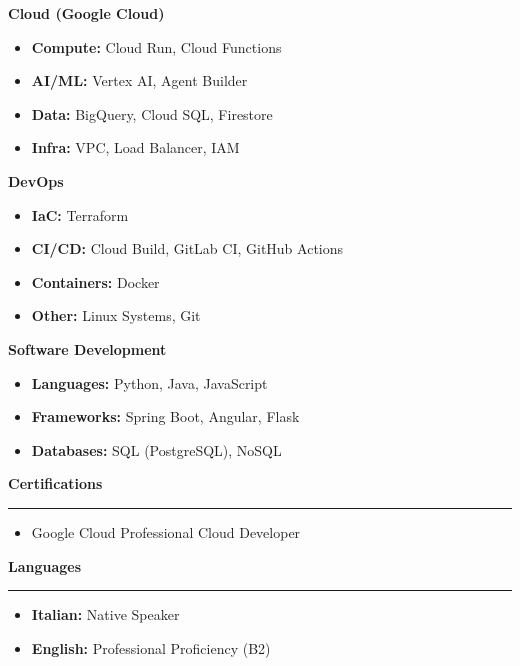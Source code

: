 \documentclass[9pt, a4paper]{article}
\newcommand{\cvsection}[1]{%
  \vspace{8pt} %
  \par %
  {\Large\bfseries\color{sectionblue}#1} %
  \par %
  \vspace{2pt} %
  \hrule %
  \vspace{6pt} %
}
\begin{document}
\begin{minipage}[t]{0.26\textwidth}
{\bfseries Cloud (Google Cloud)}
\begin{itemize}[leftmargin=*, nosep, itemsep=2pt]
    \item \textbf{Compute:} Cloud Run, Cloud Functions
    \item \textbf{AI/ML:} Vertex AI, Agent Builder
    \item \textbf{Data:} BigQuery, Cloud SQL, Firestore
    \item \textbf{Infra:} VPC, Load Balancer, IAM
\end{itemize}
\vspace{4pt}

{\bfseries DevOps}
\begin{itemize}[leftmargin=*, nosep, itemsep=2pt]
    \item \textbf{IaC:} Terraform
    \item \textbf{CI/CD:} Cloud Build, GitLab CI, GitHub Actions
    \item \textbf{Containers:} Docker
    \item \textbf{Other:} Linux Systems, Git
\end{itemize}
\vspace{4pt}

{\bfseries Software Development}
\begin{itemize}[leftmargin=*, nosep, itemsep=2pt]
    \item \textbf{Languages:} Python, Java, JavaScript
    \item \textbf{Frameworks:} Spring Boot, Angular, Flask
    \item \textbf{Databases:} SQL (PostgreSQL), NoSQL
\end{itemize}
\vspace{4pt}


\cvsection{Certifications}

\begin{itemize}[leftmargin=*, nosep, itemsep=2pt]
    \item Google Cloud Professional Cloud Developer
\end{itemize}

\cvsection{Languages}

\begin{itemize}[leftmargin=*, nosep, itemsep=2pt]
    \item \textbf{Italian:} Native Speaker
    \item \textbf{English:} Professional Proficiency (B2)
\end{itemize}

\end{minipage}

\end{document}
